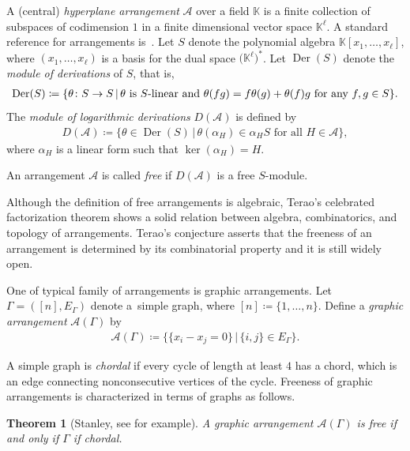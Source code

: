 \documentclass[pdftex]{sigma}
\numberwithin{equation}{section}
\newtheorem{Theorem}{Theorem}[section]
\DeclareMathOperator*{\Der}{Der}
\begin{document}
A (central) \textit{hyperplane arrangement} $ \mathcal{A} $ over a field $ \mathbb{K} $ is a finite collection of subspaces of codimension $ 1 $ in a finite dimensional vector space $ \mathbb{K}^{\ell} $.
A standard reference for arrangements is~\cite{orlik1992arrangements}.
Let $ S $ denote the polynomial algebra $ \mathbb{K}[x_{1}, \dots, x_{\ell}] $, where $ (x_{1}, \dots, x_{\ell}) $ is a basis for the dual space $ \big(\mathbb{K}^{\ell}\big) ^{\ast} $.
Let $ \Der(S) $ denote the \textit{module of derivations} of $ S $, that is,
\begin{gather*}
\Der(S) \coloneqq \{ \theta \colon S \to S \,|\, \theta \text{ is $ S $-linear and } \theta(fg) = f\theta(g) + \theta(f)g \text{ for any } f,g \in S \}.
\end{gather*}
The \textit{module of logarithmic derivations} $ D(\mathcal{A}) $ is defined by
\begin{gather*}
D(\mathcal{A}) \coloneqq \{ \theta \in \Der(S) \,|\, \theta(\alpha_{H}) \in \alpha_{H}S \text{ for all } H \in \mathcal{A} \},
\end{gather*}
where $ \alpha_{H} $ is a linear form such that $ \ker(\alpha_{H}) = H $.

\begin{Definition}
An arrangement $ \mathcal{A} $ is called \textit{free} if $ D(\mathcal{A}) $ is a free $ S $-module.
\end{Definition}

Although the definition of free arrangements is algebraic, Terao's celebrated factorization theorem \cite[Main Theorem]{terao1981generalized-im} shows a solid relation between algebra, combinatorics, and topology of arrangements.
Terao's conjecture asserts that the freeness of an arrangement is determined by its combinatorial property and it is still widely open.

One of typical family of arrangements is graphic arrangements.
Let $ \Gamma = ([n], E_{\Gamma}) $ denote a~simple graph, where $ [n] \coloneqq \{1, \dots, n\} $.
Define a \textit{graphic arrangement} $ \mathcal{A}(\Gamma) $ by
\begin{gather*}
\mathcal{A}(\Gamma) \coloneqq \{ \{x_{i}-x_{j}=0\} \,|\, \{i,j\} \in E_{\Gamma}\}.
\end{gather*}

A simple graph is \textit{chordal} if every cycle of length at least $ 4 $ has a chord, which is an edge connecting nonconsecutive vertices of the cycle.
Freeness of graphic arrangements is characterized in terms of graphs as follows.
\begin{Theorem}[{Stanley, see \cite[Theorem 3.3]{edelman1994free-mz}} for example]
A graphic arrangement $ \mathcal{A}(\Gamma) $ is free if and only if $ \Gamma $ if chordal.
\end{Theorem}
\end{document}

